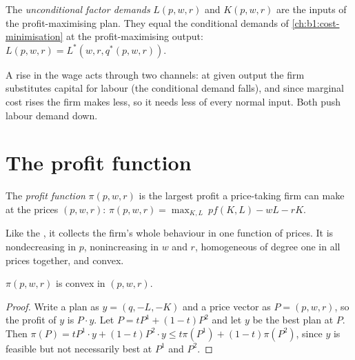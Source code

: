 \begin{definition}\label{def:b1:profit-maximisation:factor-demand}
The \emph{unconditional factor demands} $L(p, w, r)$ and $K(p, w, r)$ are the
inputs of the profit-maximising plan. They equal the conditional demands
of \cref{ch:b1:cost-minimisation} at the profit-maximising output:
$L(p, w, r) = L^*(w, r, q^*(p, w, r))$.
\end{definition}

A rise in the wage acts through two channels: at given output the firm
substitutes capital for labour (the conditional demand falls), and since
marginal cost rises the firm makes less, so it needs less of every normal
input. Both push labour demand down.

\section{The profit function}\label{sec:b1:profit-maximisation:profit-function}

\begin{definition}\label{def:b1:profit-maximisation:profit-function}
The \emph{profit function} $\pi(p, w, r)$ is the largest profit a
price-taking firm can make at the prices $(p, w, r)$:
$\pi(p, w, r) = \max_{K, L}\ pf(K, L) - wL - rK$.
\end{definition}

Like the , it collects the firm's whole behaviour in one
function of prices. It is nondecreasing in $p$, nonincreasing in $w$ and $r$,
homogeneous of degree one in all prices together, and convex.

\begin{proposition}\label{prop:b1:profit-maximisation:convex}
$\pi(p, w, r)$ is convex in $(p, w, r)$.
\end{proposition}

\begin{proof}
Write a plan as $y = (q, -L, -K)$ and a price vector as $P = (p, w, r)$, so the
profit of $y$ is $P\cdot y$. Let $P = tP^1 + (1 - t)P^2$ and let $y$ be the best plan at
$P$. Then $\pi(P) = tP^1\cdot y + (1 - t)P^2\cdot y \le t\pi(P^1) + (1 - t)\pi(P^2)$, since $y$ is
feasible but not necessarily best at $P^1$ and $P^2$.
\end{proof}


